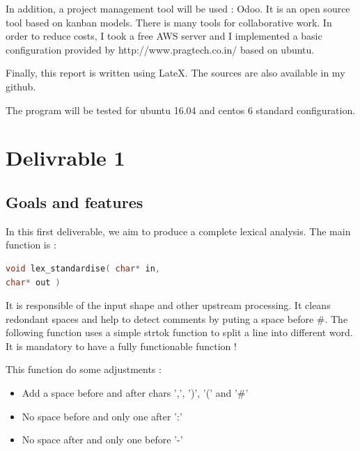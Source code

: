 \documentclass[twoside,twocolumn]{article}
\begin{document}
In addition, a project management tool will be used : Odoo. It is an open source tool based on kanban models. There is many tools for collaborative work. In order to reduce costs, I took a free AWS server and I implemented a basic configuration provided by http://www.pragtech.co.in/ based on ubuntu.

Finally, this report is written using LateX. The sources are also available in my github.

The program will be tested for ubuntu 16.04 and centos 6 standard configuration.

% 
% 
% 
% 


\section{Delivrable 1}

\subsection{Goals and features}
In this first deliverable, we aim to produce a complete lexical analysis. The main function is :

\begin{lstlisting}[language=C]
void lex_standardise( char* in, 
char* out )
\end{lstlisting}

It is responsible of the input shape and other upstream processing. It cleans redondant spaces and help to detect comments by puting a space before \#. The following function uses a simple strtok function to split a line into different word. It is mandatory to have a fully functionable function !

This function do some adjustments :

\begin{itemize}
 \item Add a space before and after chars ',', ')', '(' and '\#'
 \item No space before and only one after ':'
 \item No space after and only one before '-'
\end{itemize}
\end{document}
